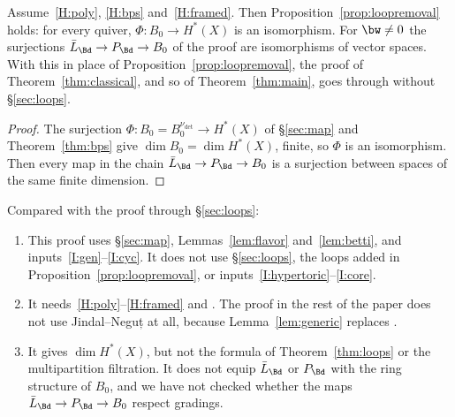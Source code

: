 \begin{corollary}\label{cor:bps}
Assume~\ref{H:poly}, \ref{H:bps} and~\ref{H:framed}.  Then
Proposition~\ref{prop:loopremoval} holds: for every quiver,
$\Phi\colon B_0\to H^*(X)$ is an isomorphism.  For $\bw\neq0$ the
surjections $\bar L_\Bd\to P_\Bd\to B_0$ of the proof are isomorphisms of
vector spaces.  With this in place of Proposition~\ref{prop:loopremoval}, the
proof of Theorem~\ref{thm:classical}, and so of Theorem~\ref{thm:main}, goes
through without \S\ref{sec:loops}.
\end{corollary}

\begin{proof}
The surjection $\Phi\colon B_0=B^{\nu_{\det}}_0\to H^*(X)$ of \S\ref{sec:map}
and Theorem~\ref{thm:bps} give $\dim B_0=\dim H^*(X)$, finite, so $\Phi$ is an
isomorphism.  Then every map in the chain $\bar L_\Bd\to P_\Bd\to B_0$ is a
surjection between spaces of the same finite dimension.
\end{proof}

\begin{remark}\label{rem:bps-compare}
Compared with the proof through \S\ref{sec:loops}:
\begin{enumerate}[leftmargin=2em]
\item This proof uses \S\ref{sec:map}, Lemmas~\ref{lem:flavor}
and~\ref{lem:betti}, and inputs~\ref{I:gen}--\ref{I:cyc}.  It does not use
\S\ref{sec:loops}, the loops added in Proposition~\ref{prop:loopremoval}, or
inputs~\ref{I:hypertoric}--\ref{I:core}.
\item It needs~\ref{H:poly}--\ref{H:framed} and .  The proof in
the rest of the paper does not use Jindal--Neguț at all, because
Lemma~\ref{lem:generic} replaces .
\item It gives $\dim H^*(X)$, but not the formula of Theorem~\ref{thm:loops} or
the multipartition filtration.  It does not equip $\bar L_\Bd$ or $P_\Bd$ with
the ring structure of $B_0$, and we have not checked whether the maps
$\bar L_\Bd\to P_\Bd\to B_0$ respect gradings.
\end{enumerate}
\end{remark}

